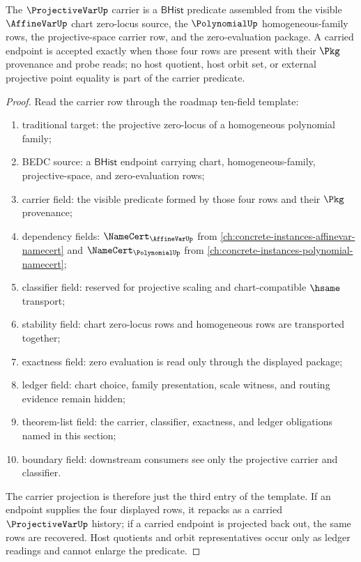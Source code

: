 \begin{theorem}
\label{thm:projectivevar-carrier-obligation}
The $\ProjectiveVarUp$ carrier is a $\mathsf{BHist}$ predicate assembled from the visible $\AffineVarUp$ chart zero-locus source, the $\PolynomialUp$ homogeneous-family rows, the projective-space carrier row, and the zero-evaluation package. A carried endpoint is accepted exactly when those four rows are present with their $\Pkg$ provenance and probe reads; no host quotient, host orbit set, or external projective point equality is part of the carrier predicate.
\end{theorem}
\begin{proof}
Read the carrier row through the roadmap ten-field template:
\begin{enumerate}
  \item traditional target: the projective zero-locus of a homogeneous polynomial family;
  \item BEDC source: a $\mathsf{BHist}$ endpoint carrying chart, homogeneous-family, projective-space, and zero-evaluation rows;
  \item carrier field: the visible predicate formed by those four rows and their $\Pkg$ provenance;
  \item dependency fields: $\NameCert_{\AffineVarUp}$ from \autoref{ch:concrete-instances-affinevar-namecert} and $\NameCert_{\PolynomialUp}$ from \autoref{ch:concrete-instances-polynomial-namecert};
  \item classifier field: reserved for projective scaling and chart-compatible $\hsame$ transport;
  \item stability field: chart zero-locus rows and homogeneous rows are transported together;
  \item exactness field: zero evaluation is read only through the displayed package;
  \item ledger field: chart choice, family presentation, scale witness, and routing evidence remain hidden;
  \item theorem-list field: the carrier, classifier, exactness, and ledger obligations named in this section;
  \item boundary field: downstream consumers see only the projective carrier and classifier.
\end{enumerate}

The carrier projection is therefore just the third entry of the template. If an endpoint supplies the four displayed rows, it repacks as a carried $\ProjectiveVarUp$ history; if a carried endpoint is projected back out, the same rows are recovered. Host quotients and orbit representatives occur only as ledger readings and cannot enlarge the predicate.
\end{proof}

